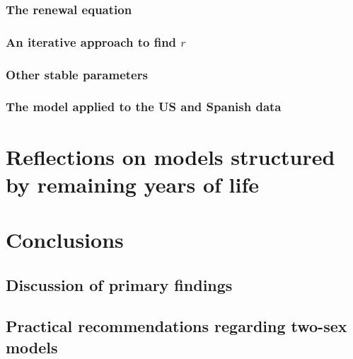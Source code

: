     \subsection{The renewal equation}
      
    \subsection{An iterative approach to find $r$}
      
    \subsection{Other stable parameters}
      
    \subsection{The model applied to the US and Spanish data}
      
  \chapter{Reflections on models structured by remaining years of life}
     
  
  \chapter{Conclusions}
    
    \section{Discussion of primary findings}
      
    \section{Practical recommendations regarding two-sex models}
      
